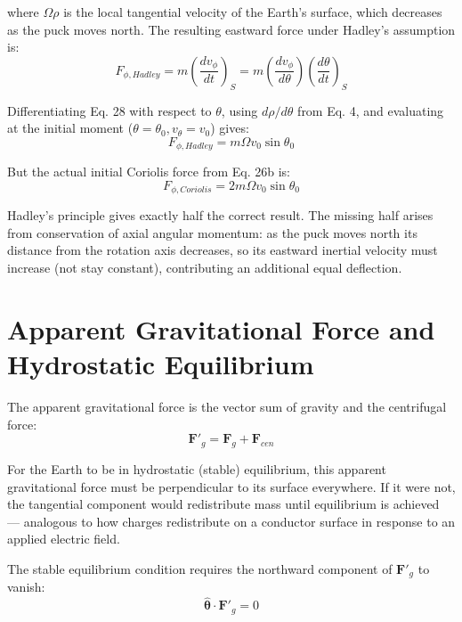 \documentclass[10pt, a4paper]{article}
\begin{document}
where $\Omega\rho$ is the local tangential velocity of the Earth’s surface, which decreases as the puck moves north. The resulting eastward force under Hadley’s assumption is:
\begin{equation}
F_{\phi, Hadley} = m\left(\frac{dv_\phi}{dt}\right)_S = m\left(\frac{dv_\phi}{d\theta}\right)\left(\frac{d\theta}{dt}\right)_S \label{eq:29}
\end{equation}

Differentiating Eq. 28 with respect to $\theta$, using $d\rho/d\theta$ from Eq. 4, and evaluating at the initial moment ($\theta = \theta_0, v_\theta = v_0$) gives: 
\begin{equation}
F_{\phi, Hadley} = m\Omega v_0 \sin\theta_0 \label{eq:30}
\end{equation}

But the actual initial Coriolis force from Eq. 26b is:
\begin{equation}
F_{\phi, Coriolis} = 2m\Omega v_0 \sin\theta_0 \label{eq:31}
\end{equation}

Hadley’s principle gives exactly half the correct result. The missing half arises from conservation of axial angular momentum: as the puck moves north its distance from the rotation axis decreases, so its eastward inertial velocity must increase (not stay constant), contributing an additional equal deflection.

\section{Apparent Gravitational Force and Hydrostatic Equilibrium}
The apparent gravitational force is the vector sum of gravity and the centrifugal force: 
\begin{equation}
\mathbf{F}'_g = \mathbf{F}_g + \mathbf{F}_{cen} \label{eq:34}
\end{equation}

For the Earth to be in hydrostatic (stable) equilibrium, this apparent gravitational force must be perpendicular to its surface everywhere. If it were not, the tangential component would redistribute mass until equilibrium is achieved — analogous to how charges redistribute on a conductor surface in response to an applied electric field. 

The stable equilibrium condition requires the northward component of $\mathbf{F}'_g$ to vanish:
\begin{equation}
\hat{\boldsymbol{\theta}} \cdot \mathbf{F}'_g = 0 \label{eq:37}
\end{equation}
\end{document}
